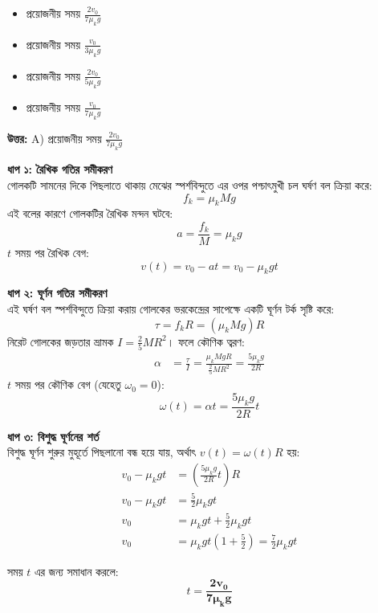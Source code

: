 \documentclass[12pt, a4paper]{article}
\begin{document}
\begin{itemize}[label={}, leftmargin=1cm, itemsep=0.5em]
    \item[\textbf{A)}] প্রয়োজনীয় সময় $\frac{2 v_0}{7 \mu_k g}$
    \item[\textbf{B)}] প্রয়োজনীয় সময় $\frac{v_0}{3 \mu_k g}$
    \item[\textbf{C)}] প্রয়োজনীয় সময় $\frac{2 v_0}{5 \mu_k g}$
    \item[\textbf{D)}] প্রয়োজনীয় সময় $\frac{v_0}{7 \mu_k g}$
\end{itemize}

\vspace{0.5em}
\begin{tcolorbox}[answerbox]
    \textbf{\color{success} উত্তর:} A) প্রয়োজনীয় সময় $\frac{2 v_0}{7 \mu_k g}$
\end{tcolorbox}
\vspace{1em}

\begin{tcolorbox}[solutionbox={সমাধান (Solution)}]
    \noindent
    \textbf{ধাপ ১: রৈখিক গতির সমীকরণ} \\
    গোলকটি সামনের দিকে পিছলাতে থাকায় মেঝের স্পর্শবিন্দুতে এর ওপর পশ্চাৎমুখী চল ঘর্ষণ বল ক্রিয়া করে:
    \[ f_k = \mu_k M g \]
    এই বলের কারণে গোলকটির রৈখিক মন্দন ঘটবে:
    \[ a = \frac{f_k}{M} = \mu_k g \]
    $t$ সময় পর রৈখিক বেগ:
    \[ v(t) = v_0 - a t = v_0 - \mu_k g t \]
    
    \vspace{0.5em}
    \noindent\textbf{ধাপ ২: ঘূর্ণন গতির সমীকরণ} \\
    এই ঘর্ষণ বল স্পর্শবিন্দুতে ক্রিয়া করায় গোলকের ভরকেন্দ্রের সাপেক্ষে একটি ঘূর্ণন টর্ক সৃষ্টি করে:
    \[ \tau = f_k R = (\mu_k M g) R \]
    নিরেট গোলকের জড়তার ভ্রামক $I = \frac{2}{5} M R^2$। ফলে কৌণিক ত্বরণ:
    \begin{align*}
        \alpha &= \frac{\tau}{I} = \frac{\mu_k M g R}{\frac{2}{5} M R^2} = \frac{5 \mu_k g}{2 R}
    \end{align*}
    $t$ সময় পর কৌণিক বেগ (যেহেতু $\omega_0 = 0$):
    \[ \omega(t) = \alpha t = \frac{5 \mu_k g}{2 R} t \]
    
    \vspace{0.5em}
    \noindent\textbf{ধাপ ৩: বিশুদ্ধ ঘূর্ণনের শর্ত} \\
    বিশুদ্ধ ঘূর্ণন শুরুর মুহূর্তে পিছলানো বন্ধ হয়ে যায়, অর্থাৎ $v(t) = \omega(t) R$ হয়:
    \begin{align*}
        v_0 - \mu_k g t &= \left(\frac{5 \mu_k g}{2 R} t\right) R \\
        v_0 - \mu_k g t &= \frac{5}{2} \mu_k g t \\
        v_0 &= \mu_k g t + \frac{5}{2} \mu_k g t \\
        v_0 &= \mu_k g t \left(1 + \frac{5}{2}\right) = \frac{7}{2} \mu_k g t
    \end{align*}
    
    সময় $t$ এর জন্য সমাধান করলে:
    \[ t = \mathbf{\frac{2 v_0}{7 \mu_k g}} \]
\end{tcolorbox}
\end{document}
